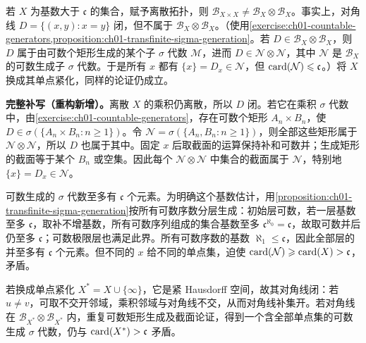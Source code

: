 \documentclass[../../main.tex]{subfiles}
\begin{document}
\begin{exercise}\label{exercise:ch07-large-discrete-product-borel}
若 $X$ 为基数大于 $\mathfrak c$ 的集合，赋予离散拓扑，则 $\mathscr B_{X\times X}\ne\mathscr B_X\otimes\mathscr B_X$。事实上，对角线 $D=\{(x,y):x=y\}$ 闭，但不属于 $\mathscr B_X\otimes\mathscr B_X$。（使用\cref{exercise:ch01-countable-generators,proposition:ch01-transfinite-sigma-generation}。若 $D\in\mathscr B_X\otimes\mathscr B_X$，则 $D$ 属于由可数个矩形生成的某个子 $\sigma$ 代数 $\mathcal M$，进而 $D\in\mathcal N\otimes\mathcal N$，其中 $\mathcal N$ 是 $\mathscr B_X$ 的可数生成子 $\sigma$ 代数。于是所有 $x$ 都有 $\{x\}=D_x\in\mathcal N$，但 $\operatorname{card}(\mathcal N)\leqslant\mathfrak c$。）将 $X$ 换成其单点紧化，同样的论证仍成立。
\end{exercise}
\begin{solution}
\textbf{完整补写（重构新增）。}离散 $X$ 的乘积仍离散，所以 $D$ 闭。若它在乘积 $\sigma$ 代数中，由\cref{exercise:ch01-countable-generators}，存在可数个矩形 $A_n\times B_n$，使 $D\in\sigma(\{A_n\times B_n:n\geqslant1\})$。令 $\mathcal N=\sigma(\{A_n,B_n:n\geqslant1\})$，则全部这些矩形属于 $\mathcal N\otimes\mathcal N$，所以 $D$ 也属于其中。固定 $x$ 后取截面的运算保持补和可数并；生成矩形的截面等于某个 $B_n$ 或空集。因此每个 $\mathcal N\otimes\mathcal N$ 中集合的截面属于 $\mathcal N$，特别地 $\{x\}=D_x\in\mathcal N$。

可数生成的 $\sigma$ 代数至多有 $\mathfrak c$ 个元素。为明确这个基数估计，用\cref{proposition:ch01-transfinite-sigma-generation}按所有可数序数分层生成：初始层可数，若一层基数至多 $\mathfrak c$，取补不增基数，所有可数序列组成的集合基数至多 $\mathfrak c^{\aleph_0}=\mathfrak c$，故取可数并后仍至多 $\mathfrak c$；可数极限层也满足此界。所有可数序数的基数 $\aleph_1\leqslant\mathfrak c$，因此全部层的并至多有 $\mathfrak c$ 个元素。但不同的 $x$ 给不同的单点集，迫使 $\operatorname{card}(\mathcal N)\geqslant\operatorname{card}(X)>\mathfrak c$，矛盾。

若换成单点紧化 $X^*=X\cup\{\infty\}$，它是紧 Hausdorff 空间，故其对角线闭：若 $u\ne v$，可取不交开邻域，乘积邻域与对角线不交，从而对角线补集开。若对角线在 $\mathscr B_{X^*}\otimes\mathscr B_{X^*}$ 内，重复可数矩形生成及截面论证，得到一个含全部单点集的可数生成 $\sigma$ 代数，仍与 $\operatorname{card}(X^*)>\mathfrak c$ 矛盾。
\end{solution}
\end{document}
